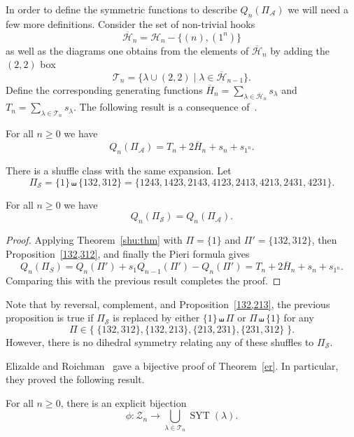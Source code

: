 \documentclass[ALCO,ThmDefs,Unicode,epreuves]{cedram}
\newcommand{\shu}{\shuffle}
\newcommand{\cHb}{\ol{\cH}}
\newcommand{\ol}{\overline}
\newcommand{\ra}{\rightarrow}
\newcommand{\la}{\lambda}
\newcommand{\cA}{{\mathcal A}}
\newcommand{\cH}{{\mathcal H}}
\newcommand{\cS}{{\mathcal S}}
\newcommand{\cT}{{\mathcal T}}
\newcommand{\cZ}{{\mathcal Z}}
\newcommand{\Hb}{\ol{H}}
\DeclareMathOperator{\SYT}{SYT}
\begin{document}
In order to define the symmetric functions to describe $Q_n(\Pi_\cA)$ we will need a few more definitions. Consider the set of non-trivial hooks
\[
\cHb_n = \cH_n-\{(n), (1^n)\}
\]
as well as the diagrams one obtains from the elements of $\cHb_n$ by adding the $(2,2)$ box
\[
\cT_n = \{\la\cup (2,2) \mid \la\in\cHb_{n-1}\}.
\]
Define the corresponding generating functions $\Hb_n=\sum_{\la\in\cHb_n} s_\la$ and $T_n=\sum_{\la\in\cT_n} s_\la$. The following result is a consequence of~\cite[Theorem 7.7]{er:ap}.
\begin{theo}
\label{er}
For all $n\ge0$ we have 
\[
Q_n(\Pi_\cA) = T_n + 2\Hb_n + s_{n} + s_{1^n}.
\]
\end{theo}

There is a shuffle class with the same expansion. Let
\[
\Pi_\cS = \{1\}\shu \{132,312\}= \{1243,1423,2143,4123,2413,4213,2431,4231\}.
\]
\begin{prop}
For all $n\ge0$ we have
\[
Q_n(\Pi_\cS)=Q_n(\Pi_\cA).
\]
\end{prop}
\begin{proof}
Applying Theorem~\ref{shu:thm} with $\Pi=\{1\}$ and $\Pi'=\{132,312\}$, then Proposition~\ref{132,312}, and finally the Pieri formula gives
\[
Q_n(\Pi_S) = Q_n(\Pi') + s_1 Q_{n-1}(\Pi') - Q_n(\Pi') = T_n + 2\Hb_n + s_{n} + s_{1^n}.
\]
Comparing this with the previous result completes the proof.
\end{proof}

Note that by reversal, complement, and Proposition~\ref{132,213}, the previous proposition is true if $\Pi_\cS$ is replaced by either $\{1\}\shu\Pi$ or $\Pi\shu\{1\}$ for any
\[
\Pi\in \{\; \{132,312\}, \{132,213\}, \{213,231\},\{231,312\}\;\}.
\]
However, there is no dihedral symmetry relating any of these shuffles to $\Pi_\cS$.

Elizalde and Roichman~\cite[Section 7.4]{er:ap} gave a bijective proof of Theorem~\ref{er}. In particular, they proved the following result.
\begin{theo}
For all $n\ge0$, there is an explicit bijection 
\[
\phi:\cZ_n\ra \bigcup_{\la\in\cT_n} \SYT(\la).
\]
\end{theo}
\end{document}
